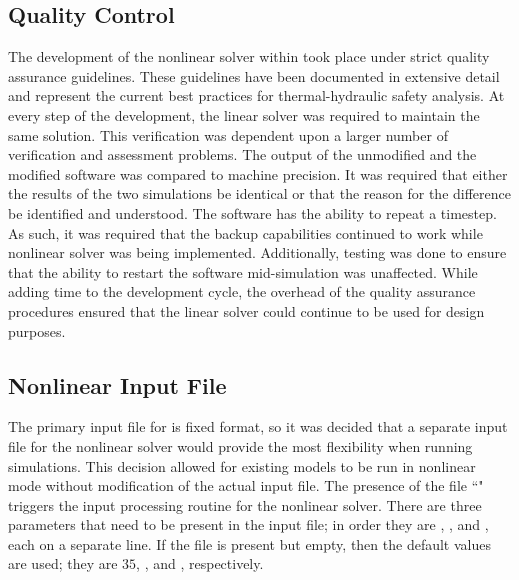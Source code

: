 \subsection{Quality Control}
\label{subsect:nlnDevelopment}
The development of the nonlinear solver within \cobra{} took place under strict quality assurance guidelines.
These guidelines have been documented in extensive detail \cite{Aumiller2013} and represent the current best practices for thermal-hydraulic safety analysis. 
At every step of the development, the linear solver was required to maintain the same solution.
This verification was dependent upon a larger number of verification and assessment problems.
The output of the unmodified \cobra{} and the modified \cobra{} software was compared to machine precision.
It was required that either the results of the two simulations be identical or that the reason for the difference be identified and understood.
The \cobra{} software has the ability to repeat a timestep.
As such, it was required that the backup capabilities continued to work while nonlinear solver was being implemented.
Additionally, testing was done to ensure that the ability to restart the software mid-simulation was unaffected.
While adding time to the development cycle, the overhead of the quality assurance procedures ensured that the linear solver could continue to be used for design purposes.

\subsection{Nonlinear Input File}
\label{subsect:nlnCobraInputFile}
The primary input file for \cobra{} is fixed format, so it was decided that a separate input file for the nonlinear solver would provide the most flexibility when running simulations.
This decision allowed for existing models to be run in nonlinear mode without modification of the actual input file.
The presence of the file ``" triggers the input processing routine for the nonlinear solver.
There are three parameters that need to be present in the input file; in order they are \kmax{}, \ftol{}, and \dtol{}, each on a separate line. 
If the file is present but empty, then the default values are used; they are $35$, , and , respectively.

